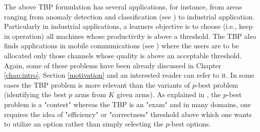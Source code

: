 The above TBP formulation has several applications, for instance, from areas ranging from anomaly detection and classification (see  \citet{locatelli2016optimal}) to industrial application. Particularly in industrial applications, a learners objective is to choose (i.e., keep in operation) all machines whose productivity is above a threshold. The TBP also finds applications in mobile communications (see \citet{audibert2010best})  where the users are to be allocated only those channels whose quality is above an acceptable threshold. Again, some of these problems have been already discussed in Chapter \ref{chap:intro}, Section \ref{motivation} and an interested reader can refer to it. In some cases the TBP problem is more relevant than the variants of $p$-best problem (identifying the best $p$ arms from $K$ given arms). As explained in \citet{locatelli2016optimal}, the $p$-best problem is a "contest" whereas the TBP is an  "exam" and in many domains, one requires the idea of "efficiency" or "correctness" threshold above which one wants to utilize an option rather than simply selecting the $p$-best options.


%
%
%
%
%